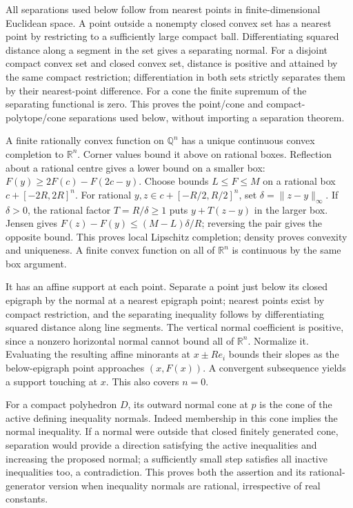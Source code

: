 \documentclass[
  11pt,
]{article}
\begin{document}
All separations used below follow from nearest points in
finite-dimensional Euclidean space. A point outside a nonempty closed
convex set has a nearest point by restricting to a sufficiently large
compact ball. Differentiating squared distance along a segment in the
set gives a separating normal. For a disjoint compact convex set and
closed convex set, distance is positive and attained by the same compact
restriction; differentiation in both sets strictly separates them by
their nearest-point difference. For a cone the finite supremum of the
separating functional is zero. This proves the point/cone and
compact-polytope/cone separations used below, without importing a
separation theorem.

A finite rationally convex function on \(\mathbb{Q}^n\) has a unique
continuous convex completion to \(\mathbb{R}^n\). Corner values bound it
above on rational boxes. Reflection about a rational centre gives a
lower bound on a smaller box: \(F(y)\geq2F(c)-F(2c-y)\). Choose bounds
\(L\leq F\leq M\) on a rational box \(c+[-2R,2R]^n\). For rational
\(y,z\in c+[-R/2,R/2]^n\), set \(\delta=\|z-y\|_\infty\). If
\(\delta>0\), the rational factor \(T=R/\delta\geq1\) puts \(y+T(z-y)\)
in the larger box. Jensen gives \(F(z)-F(y)\leq(M-L)\delta/R\);
reversing the pair gives the opposite bound. This proves local Lipschitz
completion; density proves convexity and uniqueness. A finite convex
function on all of \(\mathbb{R}^n\) is continuous by the same box
argument.

It has an affine support at each point. Separate a point just below its
closed epigraph by the normal at a nearest epigraph point; nearest
points exist by compact restriction, and the separating inequality
follows by differentiating squared distance along line segments. The
vertical normal coefficient is positive, since a nonzero horizontal
normal cannot bound all of \(\mathbb{R}^n\). Normalize it. Evaluating the
resulting affine minorants at \(x\pm Re_i\) bounds their slopes as the
below-epigraph point approaches \((x,F(x))\). A convergent subsequence
yields a support touching at \(x\). This also covers \(n=0\).

For a compact polyhedron \(D\), its outward normal cone at \(p\) is the
cone of the active defining inequality normals. Indeed membership in
this cone implies the normal inequality. If a normal were outside that
closed finitely generated cone, separation would provide a direction
satisfying the active inequalities and increasing the proposed normal; a
sufficiently small step satisfies all inactive inequalities too, a
contradiction. This proves both the assertion and its rational-generator
version when inequality normals are rational, irrespective of real
constants.
\end{document}
